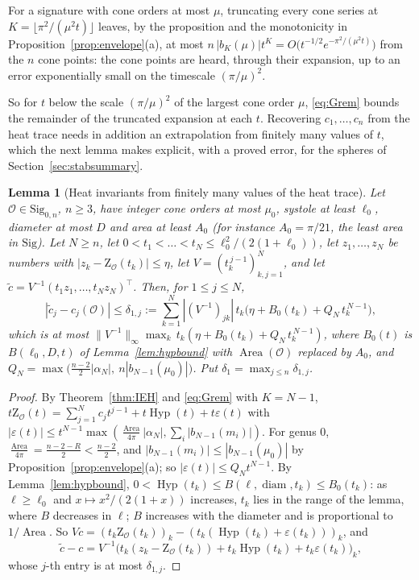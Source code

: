 \documentclass[pdflatex,sn-mathphys-num]{sn-jnl}
\theoremstyle{thmstyleone}%
\newtheorem{lemma}[theorem]{Lemma}%
\theoremstyle{thmstylethree}%
\newcommand{\Orb}{\mathcal{O}}
\newcommand{\Sig}{\mathrm{Sig}}
\newcommand{\Area}{\operatorname{Area}}
\newcommand{\Hyp}{\operatorname{Hyp}}
\newcommand{\diam}{\operatorname{diam}}
\newcommand{\cZ}{\mathrm{Z}}
\begin{document}
\begin{appendices}
For a signature with cone orders at most $\mu$, truncating every cone series at $K=\lfloor\pi^2/(\mu^2t)\rfloor$ leaves, by the proposition and the monotonicity in Proposition~\ref{prop:envelope}(a), at most $n\,|b_K(\mu)|t^K=O\big(t^{-1/2}e^{-\pi^2/(\mu^2t)}\big)$ from the $n$ cone points: the cone points are heard, through their expansion, up to an error exponentially small on the timescale $(\pi/\mu)^2$.

So for $t$ below the scale $(\pi/\mu)^2$ of the largest cone order $\mu$, \eqref{eq:Grem} bounds the remainder of the truncated expansion at each $t$. Recovering $c_1,\dots,c_n$ from the heat trace needs in addition an extrapolation from finitely many values of $t$, which the next lemma makes explicit, with a proved error, for the spheres of Section~\ref{sec:stabsummary}.

\begin{lemma}[Heat invariants from finitely many values of the heat trace]\label{lem:fromtrace}
Let $\Orb\in\Sig_{0,n}$, $n\ge3$, have integer cone orders at most $\mu_0$, systole at least $\ell_0$, diameter at most $D$ and area at least $A_0$ (for instance $A_0=\pi/21$, the least area in $\Sig$). Let $N\ge n$, let $0<t_1<\dots<t_N\le\ell_0^2/(2(1+\ell_0))$, let $z_1,\dots,z_N$ be numbers with $|z_k-\cZ_\Orb(t_k)|\le\eta$, let $V=(t_k^{\,j-1})_{k,j=1}^N$, and let $\tilde c=V^{-1}(t_1z_1,\dots,t_Nz_N)^\top$. Then, for $1\le j\le N$,
\[
  |\tilde c_j-c_j(\Orb)|\le\delta_{1,j}:=\sum_{k=1}^N|(V^{-1})_{jk}|\,t_k\Big(\eta+B_0(t_k)+Q_N\,t_k^{\,N-1}\Big),
\]
which is at most $\|V^{-1}\|_\infty\max_k\,t_k(\eta+B_0(t_k)+Q_N\,t_k^{\,N-1})$, where $B_0(t)$ is $B(\ell_0,D,t)$ of Lemma~\ref{lem:hypbound} with $\Area(\Orb)$ replaced by $A_0$, and $Q_N=\max\big(\frac{n-2}2|\alpha_N|,\ n|b_{N-1}(\mu_0)|\big)$. Put $\delta_1=\max_{j\le n}\delta_{1,j}$.
\end{lemma}

\begin{proof}
By Theorem~\ref{thm:IEH} and \eqref{eq:Grem} with $K=N-1$, $t\cZ_\Orb(t)=\sum_{j=1}^Nc_jt^{j-1}+t\Hyp(t)+t\varepsilon(t)$ with $|\varepsilon(t)|\le t^{N-1}\max(\frac{\Area}{4\pi}|\alpha_N|,\sum_i|b_{N-1}(m_i)|)$. For genus $0$, $\frac{\Area}{4\pi}=\frac{n-2-R}2<\frac{n-2}2$, and $|b_{N-1}(m_i)|\le|b_{N-1}(\mu_0)|$ by Proposition~\ref{prop:envelope}(a); so $|\varepsilon(t)|\le Q_Nt^{N-1}$. By Lemma~\ref{lem:hypbound}, $0<\Hyp(t_k)\le B(\ell,\diam,t_k)\le B_0(t_k)$: as $\ell\ge\ell_0$ and $x\mapsto x^2/(2(1+x))$ increases, $t_k$ lies in the range of the lemma, where $B$ decreases in $\ell$; $B$ increases with the diameter and is proportional to $1/\Area$. So $Vc=(t_k\cZ_\Orb(t_k))_k-(t_k(\Hyp(t_k)+\varepsilon(t_k)))_k$, and
\[
  \tilde c-c=V^{-1}\big(t_k(z_k-\cZ_\Orb(t_k))+t_k\Hyp(t_k)+t_k\varepsilon(t_k)\big)_k ,
\]
whose $j$-th entry is at most $\delta_{1,j}$.
\end{proof}


\end{appendices}
\end{document}
